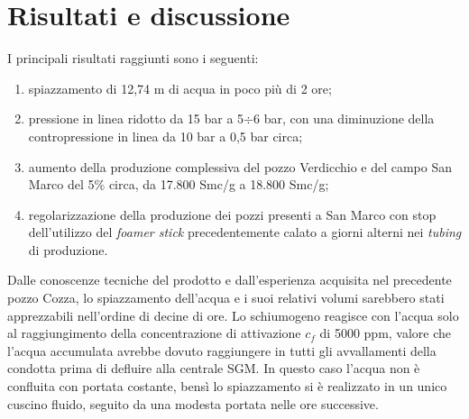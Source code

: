 \section{Risultati e discussione}
I principali risultati raggiunti sono i seguenti:
\begin{enumerate}
\item spiazzamento di 12,74 m di acqua in poco più di 2 ore;
\item pressione in linea ridotto da 15 bar a 5\(\div\)6 bar, con una diminuzione della contropressione in linea da 10 bar a 0,5 bar circa;
\item aumento della produzione complessiva del pozzo Verdicchio e del campo San Marco del 5\% circa, da 17.800 Smc/g a 18.800 Smc/g;
\item regolarizzazione della produzione dei pozzi presenti a San Marco con stop dell'utilizzo del \textit{foamer stick} precedentemente calato a giorni alterni nei \textit{tubing} di produzione. 
\end{enumerate}
Dalle conoscenze tecniche del prodotto e dall'esperienza acquisita nel precedente pozzo Cozza, lo spiazzamento dell'acqua e i suoi relativi volumi sarebbero stati apprezzabili nell'ordine di decine di ore. Lo schiumogeno reagisce con l'acqua solo al raggiungimento della concentrazione di attivazione \(c_{f}\) di 5000 ppm, valore che l'acqua accumulata avrebbe dovuto raggiungere in tutti gli avvallamenti della condotta prima di defluire alla centrale SGM. In questo caso l'acqua non è confluita con portata costante, bensì lo spiazzamento si è realizzato in un unico cuscino fluido, seguito da una modesta portata nelle ore successive.

